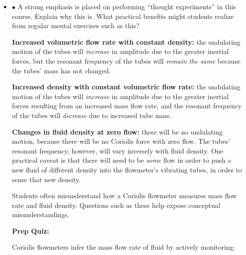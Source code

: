 \begin{itemize}
\item{$\bullet$} A strong emphasis is placed on performing ``thought experiments'' in this course.  Explain why this is.  What practical benefits might students realize from regular mental exercises such as this?
\medskip







{\bf Increased volumetric flow rate with constant density:} the undulating motion of the tubes will {\it increase} in amplitude due to the greater inertial forces, but the resonant frequency of the tubes will {\it remain the same} because the tubes' mass has not changed.

\vskip 10pt

{\bf Increased density with constant volumetric flow rate:} the undulating motion of the tubes will {\it increase} in amplitude due to the greater inertial forces resulting from an increased mass flow rate, and the resonant frequency of the tubes will {\it decrease} due to increased tube mass.

\vskip 10pt

{\bf Changes in fluid density at zero flow:} there will be no undulating motion, because there will be no Coriolis force with zero flow.  The tubes' resonant frequency, however, will vary inversely with fluid density.  One practical caveat is that there will need to be {\it some} flow in order to push a new fluid of different density into the flowmeter's vibrating tubes, in order to sense that new density.







Students often misunderstand how a Coriolis flowmeter measures mass flow rate and fluid density.  Questions such as these help expose conceptual misunderstandings.










\vfil \eject

\noindent
{\bf Prep Quiz:}

Coriolis flowmeters infer the mass flow rate of fluid by actively monitoring:


\end{itemize}
